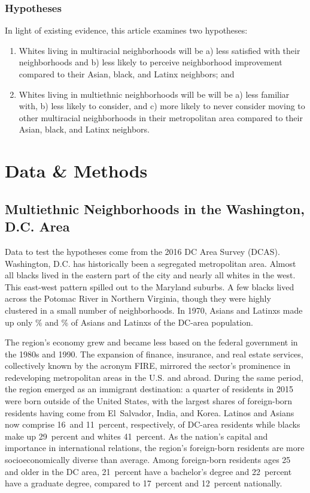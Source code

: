 \documentclass{baderart}
\newcommand{\TK}[1][]{\strong{TK #1}}
\begin{document}
\subsubsection{Hypotheses}\label{hypotheses}

In light of existing evidence, this article examines two hypotheses:


\begin{enumerate} 

\item   Whites living in multiracial neighborhoods will be a) less satisfied  with their neighborhoods and b) less likely to perceive neighborhood  improvement compared to their Asian, black, and Latinx neighbors; and 

\item   Whites living in multiethnic neighborhoods will be will be a) less familiar with, b) less likely to consider, and c) more likely to never consider moving to other multiracial neighborhoods in their metropolitan area compared to their Asian, black, and Latinx neighbors. 

\end{enumerate}

\section{Data \& Methods}\label{data}
\subsection{Multiethnic Neighborhoods in the Washington, D.C. Area}\label{multiethnic-neighborhoods-in-the-washington-d.c.-area}

Data to test the hypotheses come from the 2016 DC Area Survey (DCAS). Washington, D.C. has historically been a segregated metropolitan area. Almost all blacks lived in the eastern part of the city and nearly all whites in the west. This east-west pattern spilled out to the Maryland suburbs. A few blacks lived across the Potomac River in Northern Virginia, though they were highly clustered in a small number of neighborhoods. In 1970, Asians and Latinxs made up only \TK\% and \TK\% of Asians and Latinxs of the DC-area population.

The region's economy grew and became less based on the federal government in the 1980s and 1990. The expansion of finance, insurance, and real estate services, collectively known by the acronym FIRE, mirrored the sector's prominence in redeveloping metropolitan areas in the U.S. and abroad. During the same period, the region emerged as an immigrant destination: a quarter of residents in 2015 were born outside of the United States, with the largest shares of foreign-born residents having come from El~Salvador, India, and Korea. Latinos and Asians now comprise 16~and 11~percent, respectively, of DC-area residents while blacks make up 29~percent and whites 41~percent. As the nation's capital and importance in international relations, the region's foreign-born residents are more socioeconomically diverse than average. Among foreign-born residents ages 25 and older in the DC area, 21~percent have a bachelor's degree and 22~percent have a graduate degree, compared to 17~percent and 12~percent nationally. 
\end{document}
